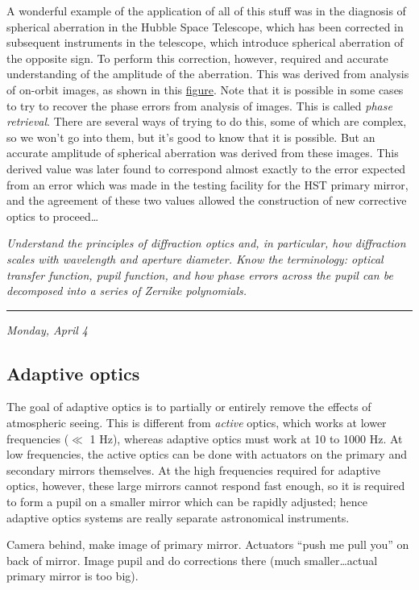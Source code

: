\documentclass[12pt]{article}
\newcommand{\mynotes}[1]{\textcolor{myBlue}{#1}}
\newcommand{\test}[1]{%
    \begin{center}
        {\parbox{0.9\textwidth}{\textit{\small#1}}}
    \end{center}}
\newcommand{\mydate}[1]{
    \begin{flushright}
        \rule{\textwidth}{0.4pt} %
        \footnotesize\hfill\textit{#1}
    \end{flushright}}
\begin{document}
A wonderful example of the application of all of this stuff was in the
diagnosis of spherical aberration in the Hubble Space Telescope, which has been
corrected in subsequent instruments in the telescope, which introduce spherical
aberration of the opposite sign. To perform this correction, however, required
and accurate understanding of the amplitude of the aberration. This was derived
from analysis of on-orbit images, as shown in this \href{http://astronomy.nmsu.edu/holtz/a535/html/diagrams/a535/hstspher.htm}
{figure}. Note that it is possible in some cases to try to recover the phase
errors from analysis of images. This is called \textit{phase retrieval}. There
are several ways of trying to do this, some of which are complex, so we won't
go into them, but it's good to know that it is possible. But an accurate
amplitude of spherical aberration was derived from these images. This derived
value was later found to correspond almost exactly to the error expected from
an error which was made in the testing facility for the HST primary mirror, and
the agreement of these two values allowed the construction of new corrective
optics to proceed\ldots

\test{Understand the principles of diffraction optics and, in particular,
how diffraction scales with wavelength and aperture diameter. Know the
terminology: optical transfer function, pupil function, and how phase
errors across the pupil can be decomposed into a series of Zernike polynomials.}

\mydate{Monday, April 4}
\subsection{Adaptive optics}
The goal of adaptive optics is to partially or entirely remove the effects of
atmospheric seeing. This is different from \textit{active} optics, which works
at lower frequencies ($\ll$ 1 Hz), whereas adaptive optics must work at 10 to
1000 Hz.  At low frequencies, the active optics can be done with actuators on
the primary and secondary mirrors themselves.  At the high frequencies required
for adaptive optics, however, these large mirrors cannot respond fast enough,
so it is required to form a pupil on a smaller mirror which can be rapidly
adjusted; hence adaptive optics systems are really separate astronomical
instruments.

\mynotes{Camera behind, make image of primary mirror.
Actuators ``push me pull you'' on back of mirror.
Image pupil and do corrections there (much smaller\ldots actual
primary mirror is too big).}
\end{document}
